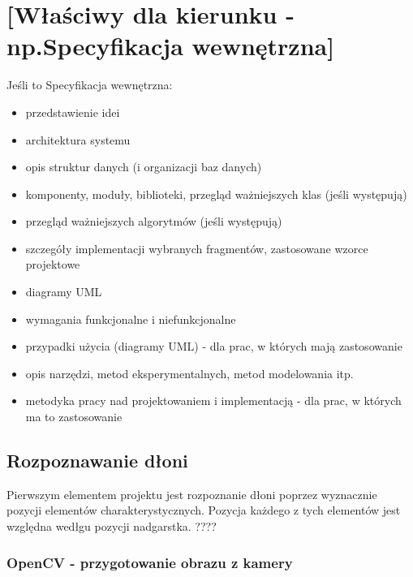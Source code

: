 \chapter{[Właściwy dla kierunku - np.Specyfikacja wewnętrzna]}
Jeśli to Specyfikacja wewnętrzna:
\begin{itemize}
\item przedstawienie idei
\item architektura systemu
\item opis struktur danych (i organizacji baz danych)
\item komponenty, moduły, biblioteki, przegląd ważniejszych klas (jeśli występują)
\item przegląd ważniejszych algorytmów (jeśli występują)
\item szczegóły implementacji wybranych fragmentów, zastosowane wzorce projektowe
\item diagramy UML
\end{itemize}


\begin{itemize}
    \item wymagania funkcjonalne i niefunkcjonalne
    \item przypadki użycia (diagramy UML) - dla prac, w których mają zastosowanie
    \item opis narzędzi, metod eksperymentalnych, metod modelowania itp.
    \item metodyka pracy nad projektowaniem i implementacją - dla prac, w których ma to zastosowanie
    \end{itemize}
    
    \section{Rozpoznawanie dłoni}
    
    \quad Pierwszym elementem projektu jest rozpoznanie dłoni poprzez wyznacznie pozycji elementów charakterystycznych. Pozycja każdego z tych elementów jest względna wedłgu pozycji nadgarstka. ????



    \subsection{OpenCV - przygotowanie obrazu z kamery}
    
